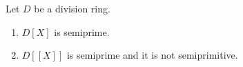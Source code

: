 \begin{exercise}
	Let $D$ be a division ring. 
	\begin{enumerate}
		\item $D[X]$ is semiprime.
		\item $D[\![X]\!]$ is semiprime and it is not semiprimitive.
	\end{enumerate}
\end{exercise}


%
%
%
%
%
%
